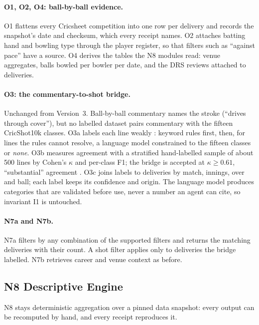 \documentclass[11pt,a4paper]{article}
\begin{document}
\paragraph{O1, O2, O4: ball-by-ball evidence.} O1 flattens every Cricsheet
competition into one row per delivery and records the snapshot's date and
checksum, which every receipt names. O2 attaches batting hand and bowling type
through the player register, so that filters such as ``against pace'' have a
source. O4 derives the tables the N8 modules read: venue aggregates, balls bowled
per bowler per date, and the DRS reviews attached to deliveries.

\paragraph{O3: the commentary-to-shot bridge.} Unchanged from Version~3.
Ball-by-ball commentary names the stroke (``drives through cover''), but no
labelled dataset pairs commentary with the fifteen CricShot10k classes. O3a
labels each line weakly \cite{snorkel}: keyword rules first, then, for lines the
rules cannot resolve, a language model constrained to the fifteen classes or
\emph{none}. O3b measures agreement with a stratified hand-labelled sample of
about 500 lines by Cohen's $\kappa$ \cite{cohen} and per-class F1; the bridge is
accepted at $\kappa \geq 0.61$, ``substantial'' agreement \cite{landis}. O3c
joins labels to deliveries by match, innings, over and ball; each label keeps its
confidence and origin. The language model produces categories that are validated
before use, never a number an agent can cite, so invariant I1 is untouched.

\paragraph{N7a and N7b.} N7a filters by any combination of the supported filters
and returns the matching deliveries with their count. A shot filter applies only
to deliveries the bridge labelled. N7b retrieves career and venue context as
before.

\subsection{N8 Descriptive Engine}

N8 stays deterministic aggregation over a pinned data snapshot: every output can
be recomputed by hand, and every receipt reproduces it.
\end{document}
